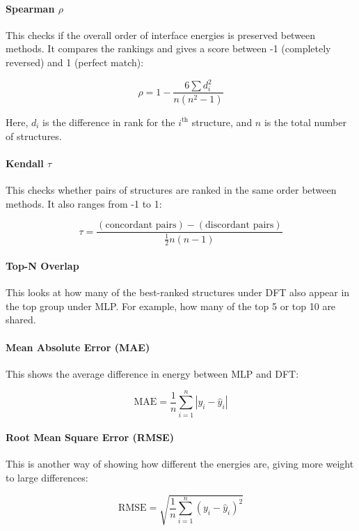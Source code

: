 \paragraph{Spearman \( \rho \)}

This checks if the overall order of interface energies is preserved between methods. It compares the rankings and gives a score between -1 (completely reversed) and 1 (perfect match):

\[
\rho = 1 - \frac{6 \sum d_i^2}{n(n^2 - 1)}
\]

Here, \( d_i \) is the difference in rank for the \( i^\text{th} \) structure, and \( n \) is the total number of structures.

\paragraph{Kendall \( \tau \)}

This checks whether pairs of structures are ranked in the same order between methods. It also ranges from -1 to 1:

\[
\tau = \frac{(\text{concordant pairs}) - (\text{discordant pairs})}{\frac{1}{2}n(n-1)}
\]

\paragraph{Top-N Overlap}

This looks at how many of the best-ranked structures under DFT also appear in the top group under MLP. For example, how many of the top 5 or top 10 are shared.

\paragraph{Mean Absolute Error (MAE)}

This shows the average difference in energy between MLP and DFT:

\[
\text{MAE} = \frac{1}{n} \sum_{i=1}^{n} |y_i - \hat{y}_i|
\]

\paragraph{Root Mean Square Error (RMSE)}

This is another way of showing how different the energies are, giving more weight to large differences:

\[
\text{RMSE} = \sqrt{\frac{1}{n} \sum_{i=1}^{n} (y_i - \hat{y}_i)^2}
\]

